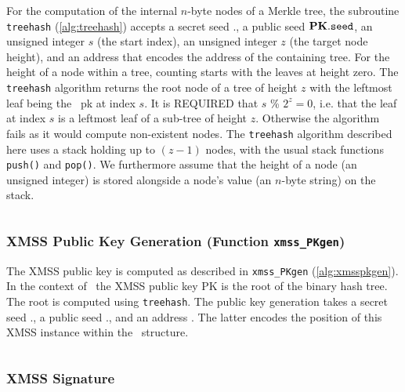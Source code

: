 For the computation of the internal $n$-byte nodes of a Merkle tree, the subroutine \texttt{treehash} (\cref{alg:treehash}) accepts a secret seed \sk.\seed, a public seed $\mathbf{PK}.\mathtt{seed}$, an unsigned integer $s$ (the start index), an unsigned integer $z$ (the target node height), and an address \ADRS that encodes the address of the containing tree. For the height of a node within a tree, counting starts with the leaves at height zero. The \texttt{treehash} algorithm returns the root node of a tree of height $z$ with the leftmost leaf being the \WOTSCS\ pk at index $s$. It is REQUIRED that $s$ \% $2^{z}=0$, i.e. that the leaf at index $s$ is a leftmost leaf of a sub-tree of height $z$. Otherwise the algorithm fails as it would compute non-existent nodes. The \texttt{treehash} algorithm described here uses a stack holding up to $(z-1)$ nodes, with the usual stack functions \texttt{push()} and \texttt{pop()}. We furthermore assume that the height of a node (an unsigned integer) is stored alongside a node's value (an $n$-byte string) on the stack.

\begin{algorithm}
\inputminted[breaklines,linenos,tabsize=2,mathescape,escapeinside=||]{C}{code/treehash.cs}
\caption{\texttt{treehash} --- The TreeHash algorithm.}
\label{alg:treehash}
\end{algorithm}

\subsubsection{XMSS Public Key Generation (Function \texttt{xmss\_PKgen})}

The XMSS public key is computed as described in \texttt{xmss\_PKgen} (\cref{alg:xmsspkgen}). In the context of \SPHINCSA\ the XMSS public key PK is the root of the binary hash tree. The root is computed using \texttt{treehash}. The public key generation takes a secret seed \sk.\seed, a public seed \pk.\seed, and an address \ADRS. The latter encodes the position of this XMSS instance within the \SPHINCSA\ structure.

\begin{algorithm}
    \inputminted[breaklines,linenos,tabsize=2,mathescape,escapeinside=||]{C}{code/xmss_PKgen.cs}
    \caption{\texttt{xmss\_PKgen} --- Generating an XMSS public key.}
    \label{alg:xmsspkgen}
\end{algorithm}

\subsubsection{XMSS Signature}

